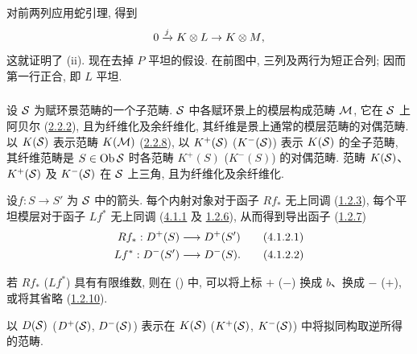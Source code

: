 对前两列应用\pageoriginale 蛇引理, 得到
\[
0\xrightarrow{j}K\otimes L\rightarrow K\otimes M{\quoi},
\]
这就证明了 (ii). 现在去掉 $P$ 平坦的假设. 在前图中, 三列及两行为短正合列; 因而第一行正合, 即 $L$ 平坦.

\setcounter{subsubsection}{1}
\subsubsection{}
设 $\Ss$ 为赋环景范畴的一个子范畴. $\Ss$ 中各赋环景上的模层构成范畴 $\Mm$, 它在 $\Ss$ 上阿贝尔 (\hyperref[XVII.def2.2.2]{2.2.2}), 且为纤维化及余纤维化, 其纤维是景上通常的模层范畴的对偶范畴. 以 $K(\Ss)$ 表示范畴 $K(\Mm)$ (\hyperref[XVII.exem2.2.8]{2.2.8}), 以 $K^{+}(\Ss)$ (\resp $K^{-}(\Ss)$) 表示 $K(\Ss)$ 的全子范畴, 其纤维范畴是 $S\in \Ob \Ss$ 时各范畴 $K^{+}(S)$ (\resp $K^{-}(S)$) 的对偶范畴. 范畴 $K(\Ss)$、$K^{+}(\Ss)$ 及 $K^{-}(\Ss)$ 在 $\Ss$ 上三角, 且为纤维化及余纤维化.

设\pageoriginale $f:S\rightarrow S'$ 为 $\Ss$ 中的箭头. 每个内射对象对于函子 $Rf_{\ast}$ 无上同调 (\hyperref[XVII.def1.2.3]{1.2.3}), 每个平坦模层对于函子 $Lf^{\ast}$ 无上同调 (\hyperref[XVII.prop4.1.1]{4.1.1} 及 \hyperref[XVII.prop1.2.6]{1.2.6}), 从而得到导出函子 (\hyperref[XVII.prop1.2.7]{1.2.7})
\begin{align*}
Rf_{\ast}:D^{+}(S) &\longrightarrow D^{+}(S')\tag{4.1.2.1}\\
Lf^{\ast}:D^{-}(S\sisi{}{'}) &\longrightarrow D^{-}(S\sisi{'}{}){\quoi}.\tag{4.1.2.2}
\end{align*}

若 $Rf_{\ast}$ (\resp $Lf^{\ast}$) 具有有限维数, 则在  (\resp {}) 中, 可以将上标 $+$ (\resp $-$) 换成 $b$、换成 $-$ (\resp $+$), 或将其省略 (\hyperref[XVII.prop1.2.10]{1.2.10}).

以 $D(\Ss)$ (\resp $D^{+}(\Ss)$, \resp $D^{-}(\Ss)$) 表示在 $K(\Ss)$ (\resp $K^{+}(\Ss)$, \resp $K^{-}(\Ss)$) 中将拟同构取逆所得的范畴.

